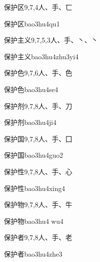 \begin{entry}{保护区}{9,7,4}{⼈、⼿、⼖}
  \begin{phonetics}{保护区}{bao3hu4qu1}
  \end{phonetics}
\end{entry}

\begin{entry}{保护主义}{9,7,5,3}{⼈、⼿、⼂、⼂}
  \begin{phonetics}{保护主义}{bao3hu4zhu3yi4}
  \end{phonetics}
\end{entry}

\begin{entry}{保护色}{9,7,6}{⼈、⼿、⾊}
  \begin{phonetics}{保护色}{bao3hu4se4}
  \end{phonetics}
\end{entry}

\begin{entry}{保护剂}{9,7,8}{⼈、⼿、⼑}
  \begin{phonetics}{保护剂}{bao3hu4ji4}
  \end{phonetics}
\end{entry}

\begin{entry}{保护国}{9,7,8}{⼈、⼿、⼞}
  \begin{phonetics}{保护国}{bao3hu4guo2}
  \end{phonetics}
\end{entry}

\begin{entry}{保护性}{9,7,8}{⼈、⼿、⼼}
  \begin{phonetics}{保护性}{bao3hu4xing4}
  \end{phonetics}
\end{entry}

\begin{entry}{保护物}{9,7,8}{⼈、⼿、⽜}
  \begin{phonetics}{保护物}{bao3hu4 wu4}
  \end{phonetics}
\end{entry}

\begin{entry}{保护者}{9,7,8}{⼈、⼿、⽼}
  \begin{phonetics}{保护者}{bao3hu4zhe3}
  \end{phonetics}
\end{entry}

